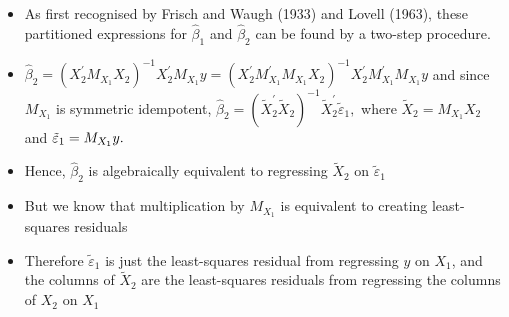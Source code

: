 \documentclass[notes=show]{beamer}
\begin{document}
\begin{frame}%


\begin{itemize}
\item As first recognised by Frisch and Waugh (1933) and Lovell (1963),
these partitioned expressions for $\widehat{\beta }_{1}$ and $\widehat{\beta 
}_{2}$ can be found by a two-step procedure.

\item $\widehat{\beta }_{2}=(X_{2}^{\prime
}M_{X_{1}}X_{2})^{-1}X_{2}^{\prime }M_{X_{1}}y=(X_{2}^{\prime
}M_{X_{1}}^{\prime }M_{X_{1}}X_{2})^{-1}X_{2}^{\prime }M_{X_{1}}^{\prime
}M_{X_{1}}y$ and since $M_{X_{1}}$ is symmetric idempotent, $\widehat{\beta }%
_{2}=(\tilde{X}_{2}^{\prime }\tilde{X}_{2})^{-1}\tilde{X}_{2}^{\prime }%
\tilde{\varepsilon}_{1},$ where $\tilde{X}_{2}=M_{X_{1}}X_{2}$ and $\tilde{%
\varepsilon}_{1}=M_{X_{1}}y.$

\item Hence, $\widehat{\beta }_{2}$ is algebraically equivalent to
regressing $\tilde{X}_{2}$ on $\tilde{\varepsilon}_{1}$

\item But we know that multiplication by $M_{X_{1}}$ is equivalent to
creating least-squares residuals

\item Therefore $\tilde{\varepsilon}_{1}$ is just the least-squares residual
from regressing $y$ on $X_{1}$, and the columns of $\tilde{X}_{2}$ are the
least-squares residuals from regressing the columns of $X_{2}$ on $X_{1}$
\end{itemize}

\end{frame}%
\end{document}
